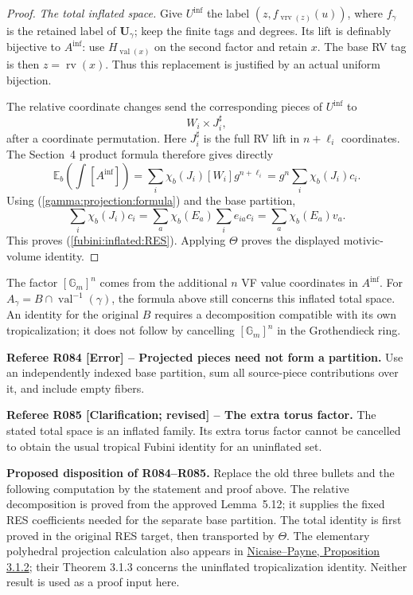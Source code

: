 \documentclass[12pt]{amsart}
\theoremstyle{remark}
\theoremstyle{definition}
\newcommand{\rv}{\operatorname{rv}}
\newcommand{\vrv}{\operatorname{vrv}}
\numberwithin{equation}{section}
\newcommand{\Gm}{\mathbb G_m}
\newcommand{\E}{\mathbb E_b}
\newcommand{\vv}{\operatorname{val}}
\theoremstyle{plain}
\begin{document}
{\begin{proof}
\newpage
\emph{The total inflated space.}
Give $U^{\mathrm{inf}}$ the label
$(z,f_{\vrv(z)}(u))$, where $f_\gamma$ is the retained
label of $\bm U_\gamma$; keep the finite tags and degrees.
Its lift is definably bijective to $A^{\mathrm{inf}}$:
use $H_{\vv(x)}$ on the second factor and retain $x$.
The base RV tag is then $z=\rv(x)$. Thus this replacement
is justified by an actual uniform bijection.

The relative coordinate changes send the corresponding pieces
of $U^{\mathrm{inf}}$ to
\[
 W_i\times J_i^\sharp,
\]
after a coordinate permutation. Here $J_i^\sharp$ is the
full RV lift in $n+\ell_i$ coordinates.
The Section~4 product formula therefore gives directly
\[
 \E\!\left(\int[A^{\mathrm{inf}}]\right)
   =\sum_i\chi_b(J_i)[W_i]g^{n+\ell_i}
   =g^n\sum_i\chi_b(J_i)c_i.
\]
Using (\ref{gamma:projection:formula}) and the base partition,
\[
 \sum_i\chi_b(J_i)c_i
     =\sum_a\chi_b(E_a)\sum_i e_{ia}c_i
     =\sum_a\chi_b(E_a)v_a.
\]
This proves (\ref{fubini:inflated:RES}). Applying $\Theta$
proves the displayed motivic-volume identity.
\end{proof}

The factor $[\Gm]^n$ comes from the additional $n$ VF value
coordinates in $A^{\mathrm{inf}}$.
For $A_\gamma=B\cap\vv^{-1}(\gamma)$, the formula above still
concerns this inflated total space.
An identity for the original $B$ requires a decomposition
compatible with its own tropicalization; it does not follow by
cancelling $[\Gm]^n$ in the Grothendieck ring.
}
\medskip

{\normalfont\small\color{RefereePurple}
\noindent\textbf{Referee R084 [Error] -- Projected pieces need not
form a partition.}
Use an independently indexed base partition, sum all source-piece
contributions over it, and include empty fibers.\par\medskip
\noindent\textbf{Referee R085 [Clarification; revised] --
The extra torus factor.}
The stated total space is an inflated family. Its extra torus
factor cannot be cancelled to obtain the usual tropical Fubini
identity for an uninflated set.\par}
\medskip

{\normalfont\small\color{ProposalOrange}
\noindent\textbf{Proposed disposition of R084--R085.}
Replace the old three bullets and the following computation
by the statement and proof above. The relative decomposition is
proved from the approved Lemma~5.12; it supplies the fixed
RES coefficients needed for the separate base partition.
The total identity is first proved in the original RES target,
then transported by $\Theta$.
The elementary polyhedral projection calculation also appears
in \href{https://web.ma.utexas.edu/users/sampayne/pdf/TropicalFubini.pdf}{Nicaise--Payne,
Proposition 3.1.2}; their Theorem 3.1.3 concerns the
uninflated tropicalization identity. Neither result is used
as a proof input here.}
\end{document}
